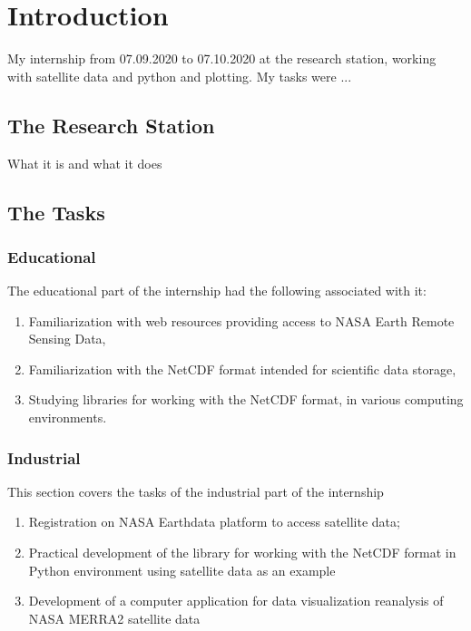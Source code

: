 \documentclass[../00_main.tex]{subfiles}
\begin{document}
\section{Introduction}

My internship from 07.09.2020 to 07.10.2020 at the research station, working
with satellite data and python and plotting. My tasks were ...

\subsection{The Research Station}

What it is and what it does

\subsection{The Tasks}

\subsubsection{Educational}

The educational part of the internship had the following associated with it:

\begin{enumerate}
    \item Familiarization with web resources providing access to NASA Earth 
        Remote Sensing Data,
    \item Familiarization with the NetCDF format intended for scientific data 
        storage,
    \item Studying libraries for working with the NetCDF format, in various 
        computing environments.
\end{enumerate}
 
\subsubsection{Industrial}

This section covers the tasks of the industrial part of the internship

\begin{enumerate}
    \item Registration on NASA Earthdata platform to access satellite data;
    \item Practical development of the library for working with the NetCDF 
        format in Python environment using satellite data as an example
    \item Development of a computer application for data visualization 
        reanalysis of NASA MERRA2 satellite data
\end{enumerate}
\end{document}
